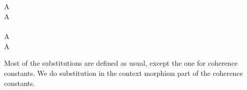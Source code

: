 \documentclass{acm_proc_article-sp}
\begin{document}
{\begin{code}
\\
%
\\
%
\\
\> \AgdaSymbol{:}    \AgdaSymbol{:} \AgdaSymbol{\}\{} \AgdaSymbol{:}   \AgdaSymbol{\}\{} \AgdaSymbol{:}   \AgdaSymbol{\}\{} \AgdaSymbol{:}   \AgdaSymbol{\}\{} \AgdaSymbol{:}  \AgdaSymbol{\}}\<%
\\
\>[0]\<[7]%
\>[7]     \<%
\\
\>[0]\<[7]%
\>[7]   \AgdaSymbol{(}  \AgdaSymbol{)}    \<%
\\
\>  \AgdaSymbol{=}   \AgdaSymbol{(}      \AgdaSymbol{\_)} \AgdaSymbol{)}\<%
\\
%
\\
%
\\
\> \AgdaSymbol{\{}A \AgdaSymbol{=} \AgdaInductiveConstructor{*}\AgdaSymbol{\}} \AgdaSymbol{=} \<%
\\
\> \AgdaSymbol{\{}A \AgdaSymbol{=}  \AgdaSymbol{\{}\AgdaSymbol{\}}  \AgdaSymbol{\}} \AgdaSymbol{=}  \AgdaSymbol{(} \AgdaSymbol{\_)} \AgdaSymbol{(} \AgdaSymbol{\_)} \<[51]%
\>[51]\<%
\\
%
\\
\> \AgdaSymbol{\{}A \AgdaSymbol{=} \AgdaInductiveConstructor{*}\AgdaSymbol{\}} \AgdaSymbol{=} \<%
\\
\> \AgdaSymbol{\{}A \AgdaSymbol{=}  \AgdaSymbol{\{}\AgdaSymbol{\}}  \AgdaSymbol{\}} \AgdaSymbol{=}  \<[34]%
\>[34]\AgdaSymbol{(} \AgdaSymbol{\_)} \AgdaSymbol{(} \AgdaSymbol{\_)}\<%
\\
\>\<%
\end{code}
}
Most of the substitutions are defined as usual, except the one for coherence constants. We do
substitution in the context morphism part of the coherence constants.
\end{document}
